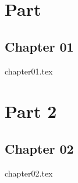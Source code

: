 \documentclass[12pt, openany]{book}
\begin{document}
\tableofcontents

\listoffigures

\listoftables


\mainmatter

\part{Part}

\chapter{Chapter 01}
{chapter01.tex}

\part{Part 2}

\chapter{Chapter 02}
{chapter02.tex}

\end{document}
